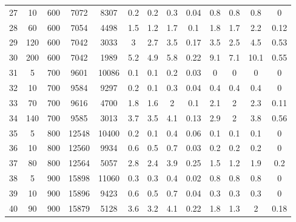 \documentclass[11pt]{article}
\begin{document}
\begin{table}[]
{\begin{tabular}{ccccc|cccc|cccc}
			27 & 10 & 600 & 7072 & 8307 & 0.2 & 0.2 & 0.3 & 0.04 & 0.8 & 0.8 & 0.8 & 0 \\
			28 & 60 & 600 & 7054 & 4498 & 1.5 & 1.2 & 1.7 & 0.1 & 1.8 & 1.7 & 2.2 & 0.12 \\
			29 & 120 & 600 & 7042 & 3033 & 3 & 2.7 & 3.5 & 0.17 & 3.5 & 2.5 & 4.5 & 0.53 \\
			30 & 200 & 600 & 7042 & 1989 & 5.2 & 4.9 & 5.8 & 0.22 & 9.1 & 7.1 & 10.1 & 0.55 \\
			\rowcolor[HTML]{EFEFEF} 
			31 & 5 & 700 & 9601 & 10086 & 0.1 & 0.1 & 0.2 & 0.03 & 0 & 0 & 0 & 0 \\
			\rowcolor[HTML]{EFEFEF} 
			32 & 10 & 700 & 9584 & 9297 & 0.2 & 0.1 & 0.3 & 0.04 & 0.4 & 0.4 & 0.4 & 0 \\
			\rowcolor[HTML]{EFEFEF} 
			33 & 70 & 700 & 9616 & 4700 & 1.8 & 1.6 & 2 & 0.1 & 2.1 & 2 & 2.3 & 0.11 \\
			\rowcolor[HTML]{EFEFEF} 
			34 & 140 & 700 & 9585 & 3013 & 3.7 & 3.5 & 4.1 & 0.13 & 2.9 & 2 & 3.8 & 0.56 \\
			35 & 5 & 800 & 12548 & 10400 & 0.2 & 0.1 & 0.4 & 0.06 & 0.1 & 0.1 & 0.1 & 0 \\
			36 & 10 & 800 & 12560 & 9934 & 0.6 & 0.5 & 0.7 & 0.03 & 0.2 & 0.2 & 0.2 & 0 \\
			37 & 80 & 800 & 12564 & 5057 & 2.8 & 2.4 & 3.9 & 0.25 & 1.5 & 1.2 & 1.9 & 0.2 \\
			\rowcolor[HTML]{EFEFEF} 
			38 & 5 & 900 & 15898 & 11060 & 0.3 & 0.3 & 0.4 & 0.02 & 0.8 & 0.8 & 0.8 & 0 \\
			\rowcolor[HTML]{EFEFEF} 
			39 & 10 & 900 & 15896 & 9423 & 0.6 & 0.5 & 0.7 & 0.04 & 0.3 & 0.3 & 0.3 & 0 \\
			\rowcolor[HTML]{EFEFEF} 
			40 & 90 & 900 & 15879 & 5128 & 3.6 & 3.2 & 4.1 & 0.22 & 1.8 & 1.3 & 2 & 0.18 \\ \hline
		\end{tabular}%
	}
\end{table}
\end{document}
